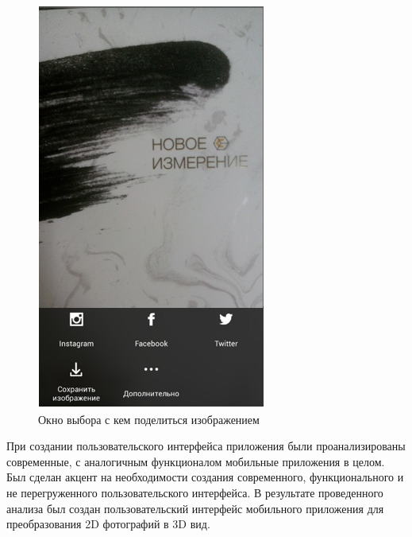 \begin{figure}[H]
	\centering
	\includegraphics[width=0.3\linewidth]{pics/Pod}
	\caption{Окно выбора с кем поделиться изображением}
	\label{fig:Pod}
\end{figure}

При создании пользовательского интерфейса приложения были проанализированы современные, с аналогичным функционалом мобильные приложения в целом. Был сделан акцент на необходимости создания современного, функционального и не перегруженного пользовательского интерфейса. В результате проведенного анализа был создан пользовательский интерфейс мобильного приложения для преобразования 2D фотографий в 3D вид.

